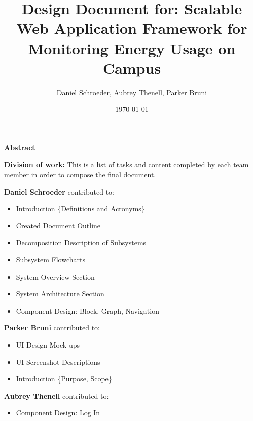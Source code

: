 \documentclass[journal,10pt,onecolumn,compsoc]{IEEEtran}
\title{Design Document for: \linebreak Scalable Web Application Framework for Monitoring Energy Usage on Campus}
\author{Daniel Schroeder, Aubrey Thenell, Parker Bruni}
\date{\today}
\begin{document}
    \maketitle
    \vspace{2cm}
    \begin{center}
    \noindent \textbf{Abstract} \\
                \indent 
                
                
    \end{center}         
    
    \newpage
    \tableofcontents
    \newpage
       \noindent\textbf{Division of work:}
       \noindent This is a list of tasks and content completed by each team member in order to compose the final document.
       
       \noindent\textbf{Daniel Schroeder} contributed to: 
       \begin{itemize}
           \item Introduction \{Definitions and Acronyms\}
           \item Created Document Outline 
           \item Decomposition Description of Subsystems
           \item Subsystem Flowcharts
           \item System Overview Section
           \item System Architecture Section
           \item Component Design: Block, Graph, Navigation
       \end{itemize}
       \noindent\textbf{Parker Bruni} contributed to:
       \begin{itemize}
           \item UI Design Mock-ups
           \item UI Screenshot Descriptions
           \item Introduction \{Purpose, Scope\}
       \end{itemize}
       \noindent\textbf{Aubrey Thenell} contributed to:
       \begin{itemize} 
         \item Component Design: Log In
       \end{itemize}
       
       \newpage
    \clearpage
    
\end{document}
